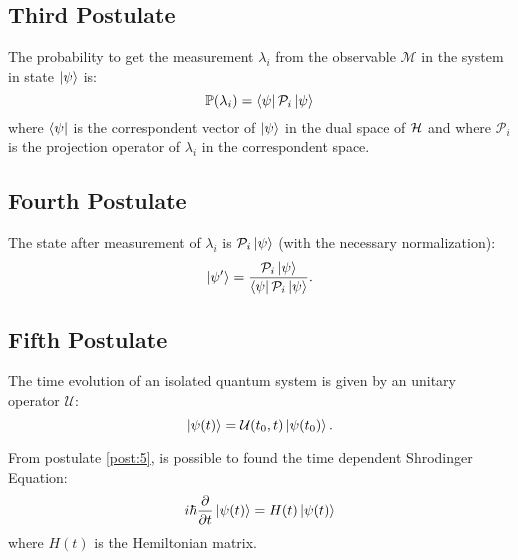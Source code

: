        \subsection{Third Postulate}
        \begin{postulate}
            The probability to get the measurement $\lambda_i$ from the observable 
            $\mathcal{M}$ in the system in state $\ket{\psi}$ is:
            \begin{equation*}
                \mathbb{P}(\lambda_i)=\bra{\psi}\mathcal{P}_i\ket{\psi}
            \end{equation*}
            where $\bra{\psi}$ is the correspondent vector of $\ket{\psi}$ in the 
            dual space of $\mathcal{H}$ and where $\mathcal{P}_i$ is the projection operator
            of $\lambda_i$ in the correspondent space.
            \label{post:3}
        \end{postulate}

        \subsection{Fourth Postulate}
        \begin{postulate}
            The state after measurement of $\lambda_i$ is $\mathcal{P}_i\ket{\psi}$ (with the
            necessary normalization):
            \begin{equation*}
                \ket{\psi'}=\frac{\mathcal{P}_i\ket{\psi}}{\bra{\psi}\mathcal{P}_i\ket{\psi}}.
            \end{equation*}
            \label{post:4}
        \end{postulate}

        \subsection{Fifth Postulate}
        \begin{postulate}
            The time evolution of an isolated quantum system is given by an unitary operator
            $\mathcal{U}$:
            \begin{equation*}
                \ket{\psi(t)}=\mathcal{U}(t_0,t)\ket{\psi(t_0)}.
            \end{equation*}
            \label{post:5}
        \end{postulate}
        \begin{observation*}
            From postulate \ref{post:5}, is possible to found the time dependent Shrodinger Equation:
            \begin{equation*}
                i\hbar\partialderivative{}{t}\ket{\psi(t)}=H(t)\ket{\psi(t)}
            \end{equation*}
            where $H(t)$ is the Hemiltonian matrix.
        \end{observation*}


